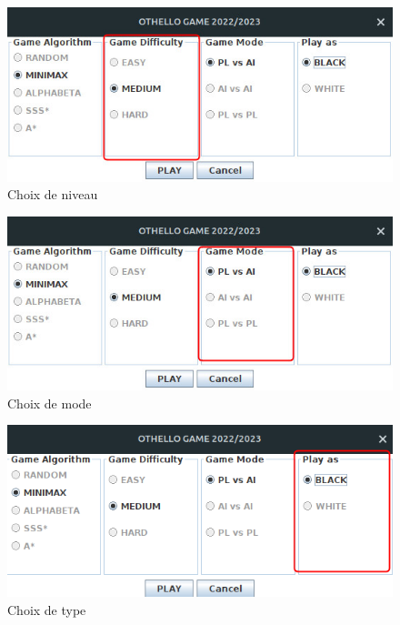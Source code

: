 \documentclass[12pt]{article}
\begin{document}
	\begin{figure}[H]
	\centering
	\includegraphics[scale=0.7]{img/othello_startNiveau.jpg}
	\caption{Choix de niveau }
	\label{niveau}
\end{figure}

	\begin{figure}[H]
	\centering
	\includegraphics[scale=0.7]{img/othello_startMode.jpg}
	\caption{Choix de mode }
	\label{mode}
\end{figure}

	\begin{figure}[H]
	\centering
	\includegraphics[scale=0.7]{img/othelloStartJoueur.png}
	\caption{Choix de type }
	\label{joueur}
\end{figure}
	
	
	
\end{document}

